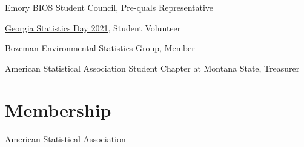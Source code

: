 \documentclass{wm_cv}
\begin{document}
Emory BIOS Student Council, Pre-quals Representative \hfill  {}

\href{https://www.stat.uga.edu/events/content/2021/georgia-statistics-day-2021}{Georgia Statistics Day 2021}, Student Volunteer \hfill  {}

Bozeman Environmental Statistics Group, Member \hfill  {}

American Statistical Association Student Chapter at Montana State, Treasurer \hfill  {}

\section{Membership}

American Statistical Association \\
\end{document}
